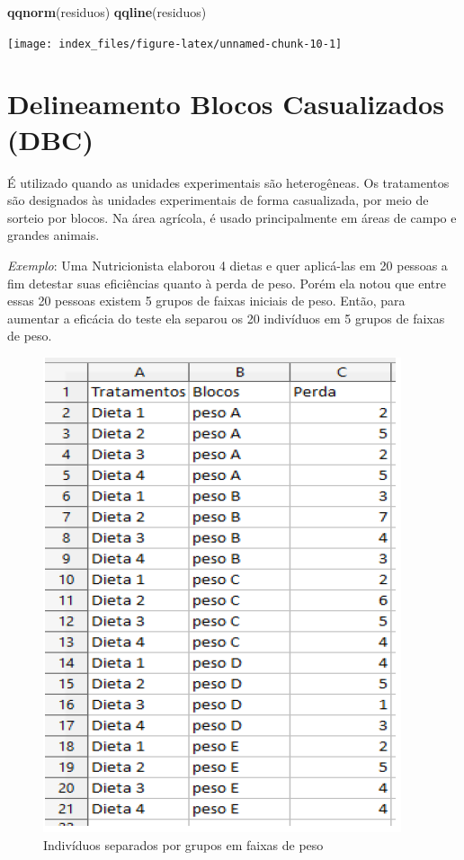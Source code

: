 \documentclass[12pt,brazil,oneside]{book}
\newenvironment{Shaded}{\begin{snugshade}}{\end{snugshade}}
\newcommand{\KeywordTok}[1]{\textcolor[rgb]{0.13,0.29,0.53}{\textbf{#1}}}
\newcommand{\NormalTok}[1]{#1}
\begin{document}
\begin{Shaded}
\begin{Highlighting}[]
\KeywordTok{qqnorm}\NormalTok{(residuos)}
\KeywordTok{qqline}\NormalTok{(residuos)}
\end{Highlighting}
\end{Shaded}

\begin{center}\texttt{[image: index\_files/figure-latex/unnamed-chunk-10-1]} \end{center}

\hypertarget{delineamento-blocos-casualizados-dbc}{%
\section{Delineamento Blocos Casualizados
(DBC)}\label{delineamento-blocos-casualizados-dbc}}

É utilizado quando as unidades experimentais são heterogêneas. Os
tratamentos são designados às unidades experimentais de forma
casualizada, por meio de sorteio por blocos. Na área agrícola, é usado
principalmente em áreas de campo e grandes animais.

\emph{Exemplo}: Uma Nutricionista elaborou 4 dietas e quer aplicá-las em
20 pessoas a fim detestar suas eficiências quanto à perda de peso. Porém
ela notou que entre essas 20 pessoas existem 5 grupos de faixas iniciais
de peso. Então, para aumentar a eficácia do teste ela separou os 20
indivíduos em 5 grupos de faixas de peso.

\begin{figure}[H]

{\centering \includegraphics[width=0.8\linewidth]{delimexp1} 

}

\caption{Indivíduos separados por grupos em faixas de peso}\label{fig:unnamed-chunk-11}
\end{figure}
\end{document}
